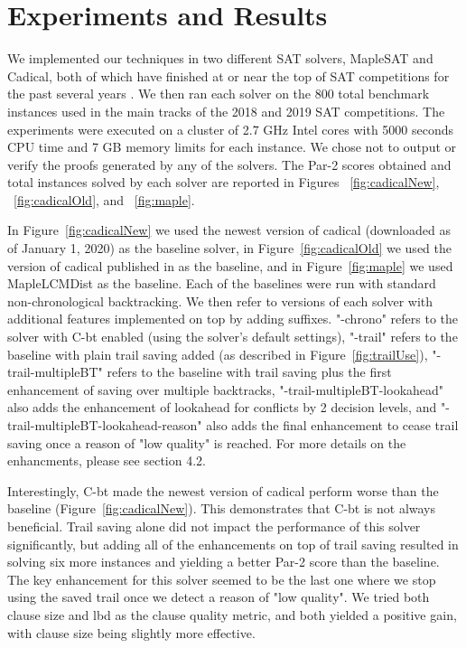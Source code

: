 \documentclass[runningheads]{llncs}
\newcommand{\cbt}{C-bt\xspace}
\begin{document}
\section{Experiments and Results}
We implemented our techniques in two different SAT solvers, MapleSAT and Cadical,
both of which have finished at or near the top of SAT competitions for the past several
years \cite{Heule2018ProceedingsOS,Heule2019ProceedingsOS}. We then ran each solver on the 800 total benchmark instances used in the main tracks of the 2018 and 2019 SAT competitions. The
experiments were executed on a cluster of 2.7 GHz Intel cores with 5000 seconds CPU time and 7 GB memory limits for each instance. We chose not to output or verify the proofs generated by any of the solvers. The Par-2 scores obtained and total instances solved by each solver are reported in Figures ~\ref{fig:cadicalNew}, ~\ref{fig:cadicalOld}, and ~\ref{fig:maple}.

In Figure~\ref{fig:cadicalNew} we used the newest version of cadical (downloaded as of January 1, 2020) as the baseline solver, in Figure~\ref{fig:cadicalOld} we used the version of cadical published in
\cite{DBLP:conf/sat/MohleB19} as the baseline, and in Figure~\ref{fig:maple} we used MapleLCMDist \cite{xiao2017maplelrb} as the baseline. Each of the baselines were run with standard non-chronological backtracking. We then refer to versions of each solver with additional features implemented on top by adding suffixes. "-chrono" refers to the solver with \cbt enabled (using the solver's default settings), "-trail" refers to the baseline with plain trail saving added (as described in Figure~\ref{fig:trailUse}), "-trail-multipleBT" refers to the baseline with trail saving plus the first enhancement of saving over multiple backtracks, "-trail-multipleBT-lookahead" also adds the enhancement of lookahead for conflicts by 2 decision levels, and "-trail-multipleBT-lookahead-reason" also adds the final enhancement to cease trail saving once a reason of "low quality" is reached. For more details on the enhancments, please see section 4.2.

Interestingly, \cbt made the newest version of cadical perform worse than the baseline (Figure~\ref{fig:cadicalNew}). This demonstrates that \cbt is not always beneficial. Trail saving alone did not impact the performance of this solver significantly, but adding all of the enhancements on top of trail saving resulted in solving six more instances and yielding a better Par-2 score than the baseline. The key enhancement for this solver seemed to be the last one where we stop using the saved trail once we detect a reason of "low quality". We tried both clause size and lbd as the clause quality metric, and both yielded a positive gain, with clause size being slightly more effective.
\end{document}
